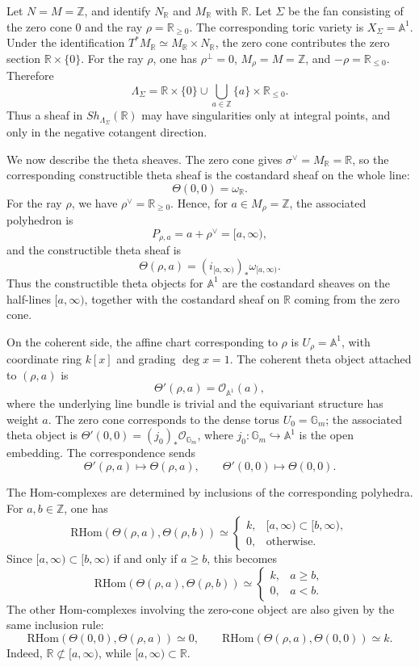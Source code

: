 Let \(N=M=\mathbb Z\), and identify \(N_{\mathbb R}\) and \(M_{\mathbb R}\) with \(\mathbb R\). Let \(\Sigma\) be the fan consisting of the zero cone \(0\) and the ray \(\rho=\mathbb R_{\ge 0}\). The corresponding toric variety is \(X_\Sigma=\mathbb A^1\). Under the identification \(T^*M_{\mathbb R}\simeq M_{\mathbb R}\times N_{\mathbb R}\), the zero cone contributes the zero section \(\mathbb R\times\{0\}\). For the ray \(\rho\), one has \(\rho^\perp=0\), \(M_\rho=M=\mathbb Z\), and \(-\rho=\mathbb R_{\le 0}\). Therefore
\[
\Lambda_\Sigma
=
\mathbb R\times\{0\}
\cup
\bigcup_{a\in\mathbb Z}\{a\}\times\mathbb R_{\le 0}.
\]
Thus a sheaf in \(Sh_{\Lambda_\Sigma}(\mathbb R)\) may have singularities only at integral points, and only in the negative cotangent direction.

We now describe the theta sheaves. The zero cone gives \(\sigma^\vee=M_{\mathbb R}=\mathbb R\), so the corresponding constructible theta sheaf is the costandard sheaf on the whole line:
\[
\Theta(0,0)=\omega_{\mathbb R}.
\]
For the ray \(\rho\), we have \(\rho^\vee=\mathbb R_{\ge 0}\). Hence, for \(a\in M_\rho=\mathbb Z\), the associated polyhedron is
\[
P_{\rho,a}=a+\rho^\vee=[a,\infty),
\]
and the constructible theta sheaf is
\[
\Theta(\rho,a)=(i_{[a,\infty)})_*\omega_{[a,\infty)}.
\]
Thus the constructible theta objects for \(\mathbb A^1\) are the costandard sheaves on the half-lines \([a,\infty)\), together with the costandard sheaf on \(\mathbb R\) coming from the zero cone.

On the coherent side, the affine chart corresponding to \(\rho\) is \(U_\rho=\mathbb A^1\), with coordinate ring \(k[x]\) and grading \(\deg x=1\). The coherent theta object attached to \((\rho,a)\) is
\[
\Theta'(\rho,a)=\mathcal O_{\mathbb A^1}(a),
\]
where the underlying line bundle is trivial and the equivariant structure has weight \(a\). The zero cone corresponds to the dense torus \(U_0=\mathbb G_m\); the associated theta object is \(\Theta'(0,0)=(j_0)_*\mathcal O_{\mathbb G_m}\), where \(j_0:\mathbb G_m\hookrightarrow\mathbb A^1\) is the open embedding. The correspondence sends
\[
\Theta'(\rho,a)\longmapsto \Theta(\rho,a),
\qquad
\Theta'(0,0)\longmapsto \Theta(0,0).
\]

The Hom-complexes are determined by inclusions of the corresponding polyhedra. For \(a,b\in\mathbb Z\), one has
\[
\mathrm{RHom}(\Theta(\rho,a),\Theta(\rho,b))
\simeq
\begin{cases}
k, & [a,\infty)\subset [b,\infty),\\
0, & \text{otherwise}.
\end{cases}
\]
Since \([a,\infty)\subset [b,\infty)\) if and only if \(a\ge b\), this becomes
\[
\mathrm{RHom}(\Theta(\rho,a),\Theta(\rho,b))
\simeq
\begin{cases}
k, & a\ge b,\\
0, & a<b.
\end{cases}
\]
The other Hom-complexes involving the zero-cone object are also given by the same inclusion rule:
\[
\mathrm{RHom}(\Theta(0,0),\Theta(\rho,a))\simeq 0,
\qquad
\mathrm{RHom}(\Theta(\rho,a),\Theta(0,0))\simeq k.
\]
Indeed, \(\mathbb R\not\subset [a,\infty)\), while \([a,\infty)\subset\mathbb R\).

